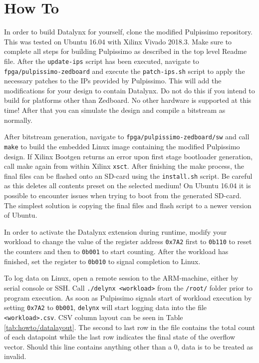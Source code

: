 \chapter{How To}
    \label{app:how_to}
    
In order to build Datalynx for yourself, clone the modified Pulpissimo repository. This was tested on Ubuntu 16.04 with Xilinx Vivado 2018.3. Make sure to complete all steps for building Pulpissimo as described in the top level Readme file. After the \texttt{update-ips} script has been executed, navigate to \texttt{fpga/pulpissimo-zedboard} and execute the \texttt{patch-ips.sh} script to apply the necessary patches to the IPs provided by Pulpissimo. This will add the modifications for your design to contain Datalynx. Do not do this if you intend to build for platforms other than Zedboard. No other hardware is supported at this time! After that you can simulate the design and compile a bitstream as normally.

After bitstream generation, navigate to \texttt{fpga/pulpissimo-zedboard/sw} and call \texttt{make} to build the embedded Linux image containing the modified Pulpissimo design. If Xilinx Bootgen returns an error upon first stage bootloader generation, call make again from within Xilinx \texttt{xsct}. After finishing the make process, the final files can be flashed onto an SD-card using the \texttt{install.sh} script. Be careful as this deletes all contents preset on the selected medium! On Ubuntu 16.04 it is possible to encounter issues when trying to boot from the generated SD-card. The simplest solution is copying the final files and flash script to a newer version of Ubuntu.

In order to activate the Datalynx extension during runtime, modify your workload to change the value of the register address \texttt{0x7A2} first to \texttt{0b110} to reset the counters and then to \texttt{0b001} to start counting. After the workload has finished, set the register to \texttt{0b010} to signal completion to Linux. 

To log data on Linux, open a remote session to the ARM-machine, either by serial console or SSH. Call \texttt{./delynx <workload>} from the \texttt{/root/} folder prior to program execution. As soon as Pulpissimo signals start of workload execution by setting \texttt{0x7A2} to \texttt{0b001}, \texttt{delynx} will start logging data into the file \texttt{<workload>.csv}. CSV column layout can be seen in Table \ref{tab:howto/datalayout}. The second to last row in the file contains the total count of each datapoint while the last row indicates the final state of the overflow vector. Should this line contains anything other than a 0, data is to be treated as invalid.


